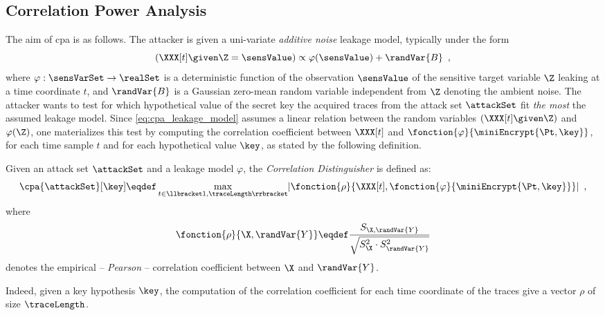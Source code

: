 \subsection{Correlation Power Analysis}
\label{sec:cpa}
The aim of \gls{cpa} is as follows.
The attacker is given a uni-variate \emph{additive noise} leakage model, typically under the form
\begin{equation}
    \left( \XXX[t] \given \Z = \sensValue \right) \propto \varphi(\sensValue) + \randVar{B} \enspace ,
    \label{eq:cpa_leakage_model}
\end{equation}
where \(\varphi: \sensVarSet \rightarrow \realSet\) is a deterministic function of the observation \(\sensValue\) of the sensitive target variable \(\Z\) leaking at a time coordinate \(t\), and \(\randVar{B}\) is a Gaussian zero-mean random variable independent from \(\Z\) denoting the ambient noise.
The attacker wants to test for which hypothetical value of the secret key the acquired traces from the attack set \(\attackSet\) fit \emph{the most} the assumed leakage model.
Since \autoref{eq:cpa_leakage_model} assumes a linear relation between the random variables \(\left( \XXX[t] \given \Z \right)\) and \(\varphi(\Z)\), one materializes this test by computing the correlation coefficient between \(\XXX[t]\) and \(\fonction{\varphi}{\miniEncrypt{\Pt, \key}}\), for each time sample \(t\) and for each hypothetical value \(\key\), as stated by the following definition.
\begin{definition}
    Given an attack set \(\attackSet\) and a leakage model \(\varphi\), the \emph{Correlation Distinguisher} is defined as:
    \begin{equation}
        \cpa{\attackSet}[\key] \eqdef \max_{t \in \llbracket 1, \traceLength \rrbracket}\lvert \fonction{\rho}{\XXX[t], \fonction{\varphi}{\miniEncrypt{\Pt, \key}}} \rvert \enspace ,
        \label{eq:dist_cpa}
    \end{equation}
    where
    \begin{equation}
        \fonction{\rho}{\X, \randVar{Y}} \eqdef \frac{S_{\X, \randVar{Y}}}{\sqrt{S_\X^2 \cdot S_{\randVar{Y}}^2}}
    \end{equation}
    denotes the empirical -- \aka{} \emph{Pearson} -- correlation coefficient between \(\X\) and \(\randVar{Y}\).
\end{definition}
Indeed, given a key hypothesis \(\key\), the computation of the correlation coefficient for each time coordinate of the traces give a vector \(\rho\) of size \(\traceLength\).%
